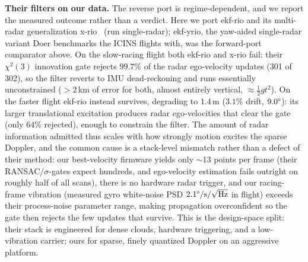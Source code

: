 \documentclass[journal]{IEEEtran}
\begin{document}
\textbf{Their filters on our data.}  The reverse port is
regime-dependent, and we report the measured outcome rather than a
verdict.  Here we port ekf-rio and its multi-radar generalization
x-rio~\cite{doer2021xrio} (run single-radar); ekf-yrio, the yaw-aided
single-radar variant Doer benchmarks the ICINS flights with, was the
forward-port comparator above.  On the slow-racing flight both ekf-rio
and x-rio fail: their
$\chi^2(3)$ innovation gate rejects $99.7\%$ of the radar ego-velocity
updates (301 of 302), so the filter reverts to IMU dead-reckoning and
runs essentially unconstrained ($>2$\,km of error for both, almost
entirely vertical, $\approx\tfrac12 g t^2$).  On the faster flight ekf-rio
instead survives, degrading to $1.4$\,m ($3.1\%$ drift,
$9.0\degree$): its larger translational excitation produces radar
ego-velocities that clear the gate (only $64\%$ rejected), enough to
constrain the filter.  The amount of radar information admitted thus
scales with how strongly motion excites the sparse Doppler, and the
common cause is a stack-level mismatch rather than a defect of their
method: our best-velocity firmware yields only $\sim$13 points per
frame (their RANSAC/$\sigma$-gates expect hundreds, and ego-velocity
estimation fails outright on roughly half of all scans), there is no
hardware radar trigger, and our racing-frame vibration (measured gyro
white-noise PSD $2.1\degree/\mathrm{s}/\sqrt{\mathrm{Hz}}$ in flight)
exceeds their process-noise parameter range, making propagation
overconfident so the gate then rejects the few updates that survive.
This is the design-space split: their stack is engineered for dense
clouds, hardware triggering, and a low-vibration carrier; ours for
sparse, finely quantized Doppler on an aggressive platform.
\end{document}
